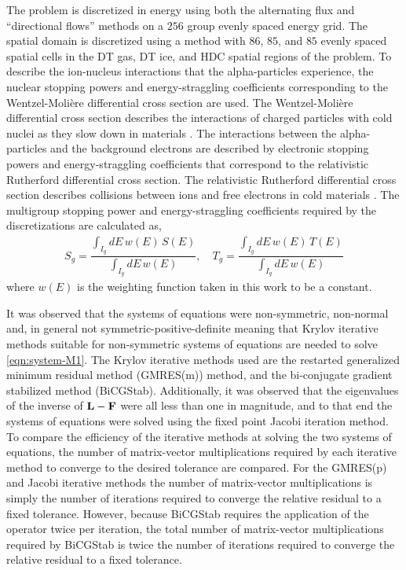 The problem is discretized in energy using both the alternating flux and ``directional flows''  methods on a $256$ group evenly spaced energy grid. The spatial domain is discretized using a  method with $86$, $85$, and $85$ evenly spaced spatial cells in the DT gas, DT ice, and HDC spatial regions of the problem. To describe the ion-nucleus interactions that the alpha-particles experience, the nuclear stopping powers and energy-straggling coefficients corresponding to the Wentzel-Moli\`{e}re differential cross section are used. The Wentzel-Moli\`{e}re differential cross section describes the interactions of charged particles with cold nuclei as they slow down in materials \cite{boschini-2011}. The interactions between the alpha-particles and the background electrons are described by electronic stopping powers and energy-straggling coefficients that correspond to the relativistic Rutherford differential cross section. The relativistic Rutherford differential cross section describes collisions between ions and free electrons in cold materials \cite{evans-1976}. The multigroup stopping power and energy-straggling coefficients required by the \dG discretizations are calculated as,
\begin{eqnarray}
  S_g = \dfrac{\int_{I_g} dE \, w(E) \, S(E)}{\int_{I_g} dE \, w(E)}, \quad T_g = \dfrac{\int_{I_g} dE \, w(E) \, T(E)}{\int_{I_g} dE \, w(E)}
\end{eqnarray}
where $w(E)$ is the weighting function taken in this work to be a constant. 

It was observed that the systems of equations were non-symmetric, non-normal and, in general not symmetric-positive-definite meaning that Krylov iterative methods suitable for non-symmetric systems of equations are needed to solve \ref{eqn:system-M1}. The Krylov iterative methods used are the restarted generalized minimum residual method (GMRES(m)) method, and the bi-conjugate gradient stabilized method (BiCGStab). Additionally, it was observed that the eigenvalues of the inverse of $\mathbf{L} - \mathbf{F}$ were all less than one in magnitude, and to that end the systems of equations were solved using the fixed point Jacobi iteration method. To compare the efficiency of the iterative methods at solving the two \dG systems of equations, the number of matrix-vector multiplications required by each iterative method to converge to the desired tolerance are compared. For the GMRES(p) and Jacobi iterative methods the number of matrix-vector multiplications is simply the number of iterations required to converge the relative residual to a fixed tolerance. However, because BiCGStab requires the application of the operator twice per iteration, the total number of matrix-vector multiplications required by BiCGStab is twice the number of iterations required to converge the relative residual to a fixed tolerance.

